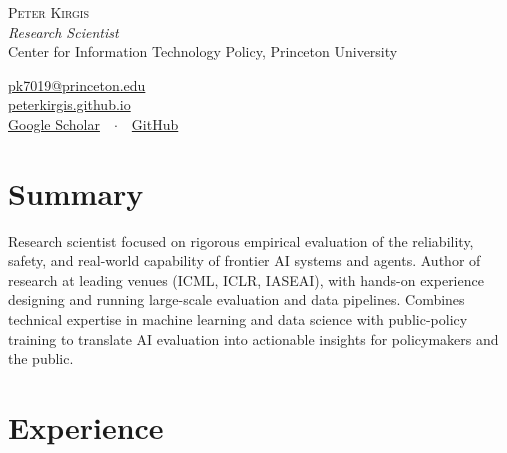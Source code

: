 \documentclass[11pt]{article}
\begin{document}
\vspace*{-1cm}

\begin{minipage}[b]{0.60\textwidth}
    {\huge\scshape Peter Kirgis}\\[0.45em]
    {\small\itshape Research Scientist}\\[1pt]
    {\small Center for Information Technology Policy, Princeton University}
\end{minipage}\hfill
\begin{minipage}[b]{0.38\textwidth}
    \raggedleft\footnotesize
    \href{mailto:pk7019@princeton.edu}{pk7019@princeton.edu}\\[3pt]
    \href{https://peterkirgis.github.io}{peterkirgis.github.io}\\[3pt]
    \href{https://scholar.google.com/citations?user=fqSbuGUAAAAJ}{Google Scholar}~~$\cdot$~~\href{https://github.com/peterkirgis}{GitHub}
\end{minipage}

\vspace{0.6em}

\section*{Summary}

Research scientist focused on rigorous empirical evaluation of the reliability, safety, and real-world capability of frontier AI systems and agents. Author of research at leading venues (ICML, ICLR, IASEAI), with hands-on experience designing and running large-scale evaluation and data pipelines. Combines technical expertise in machine learning and data science with public-policy training to translate AI evaluation into actionable insights for policymakers and the public.

\section*{Experience}
\end{document}
